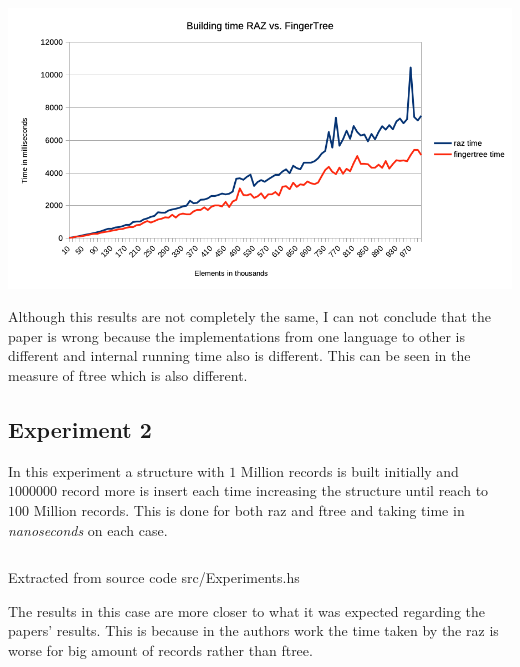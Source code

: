 \documentclass[12pt, a4paper]{article}
\begin{document}
\begin{minipage}[t]{\linewidth}
  \includegraphics[width=\textwidth]{raz_ftree_exp_1}
  \captionsetup{type=figure}
  \label{fig:raz_ftree_1}
\end{minipage}

Although this results are not completely the same, I can not conclude that the paper is wrong because the implementations from one language to other is different and internal running time also is different. This can be seen in the measure of \acrshort{ftree} which is also different.

\subsection{Experiment 2}
In this experiment a structure with $1$ Million records is built initially and $1000000$ record more is insert each time increasing the structure until reach to $100$ Million records. This is done for both \acrshort{raz} and \acrshort{ftree} and taking time in \textit{nanoseconds} on each case.

\begin{listing}[H]
  \inputminted[firstline=37, lastline=47, breaklines]{haskell}{../src/Experiments.hs}
  \caption{Extracted from source code src/Experiments.hs}
  \label{src:rac:6}
\end{listing}

The results in this case are more closer to what it was expected regarding the papers' results. This is because in the authors work the time taken by the \acrshort{raz} is worse for big amount of records rather than \acrshort{ftree}.
\end{document}
